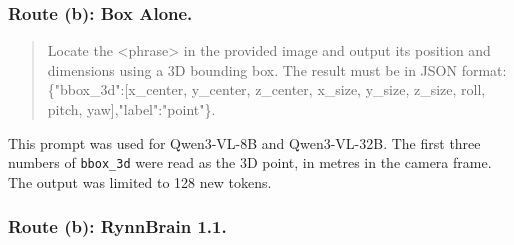 \subsubsection{Route (b): Box Alone.}
\begin{quote}\small\ttfamily\raggedright
Locate the <phrase> in the provided image and output its position and dimensions using a 3D bounding box. The result must be in JSON format: \{"bbox\_3d":[x\_center, y\_center, z\_center, x\_size, y\_size, z\_size, roll, pitch, yaw],\allowbreak{}"label":"point"\}.
\end{quote}
This prompt was used for Qwen3-VL-8B and Qwen3-VL-32B.
The first three numbers of \texttt{bbox\_3d} were read as the 3D point, in metres in the camera frame.
The output was limited to 128 new tokens.

\subsubsection{Route (b): RynnBrain 1.1.}

